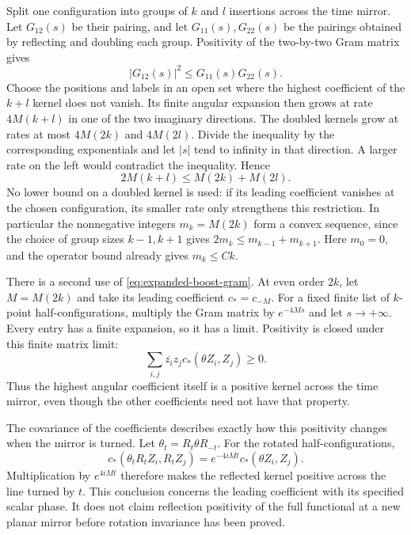 \documentclass[11pt,letterpaper,reqno]{amsart}
\theoremstyle{definition}
\theoremstyle{remark}
\begin{document}
Split one configuration into groups of $k$ and $l$ insertions across
the time mirror. Let $G_{12}(s)$ be their pairing, and let
$G_{11}(s),G_{22}(s)$ be the pairings obtained by reflecting and
doubling each group. Positivity of the two-by-two Gram matrix gives
\[
 |G_{12}(s)|^2\le G_{11}(s)G_{22}(s).
\]
Choose the positions and labels in an open set where the highest
coefficient of the $k+l$ kernel does not vanish. Its finite angular
expansion then grows at rate $4M(k+l)$ in one of the two imaginary
directions. The doubled kernels grow at rates at most $4M(2k)$ and
$4M(2l)$. Divide the inequality by the corresponding exponentials
and let $|s|$ tend to infinity in that direction. A larger rate on the
left would contradict the inequality. Hence
\begin{equation}\label{eq:degree-convexity}
 2M(k+l)\le M(2k)+M(2l).
\end{equation}
No lower bound on a doubled kernel is used: if its leading
coefficient vanishes at the chosen configuration, its smaller rate
only strengthens this restriction. In particular the nonnegative
integers $m_k=M(2k)$ form a convex sequence, since the choice of group
sizes $k-1,k+1$ gives $2m_k\le m_{k-1}+m_{k+1}$.
Here $m_0=0$, and the operator bound already gives $m_k\le Ck$.

There is a second use of \eqref{eq:expanded-boost-gram}. At even
order $2k$, let $M=M(2k)$ and take its leading coefficient
$c_*=c_{-M}$. For a fixed finite list of $k$-point
half-configurations, multiply the Gram matrix by $e^{-4Ms}$ and let
$s\to+\infty$. Every entry has a finite expansion, so it has a
limit. Positivity is closed under this finite matrix limit:
\begin{equation}\label{eq:expanded-leading-positive}
 \sum_{i,j}\overline{z_i}z_j
      c_*(\theta Z_i,Z_j)\ge0.
\end{equation}
Thus the highest angular coefficient itself is a positive kernel
across the time mirror, even though the other coefficients need not
have that property.

The covariance of the coefficients describes exactly how this
positivity changes when the mirror is turned. Let
$\theta_t=R_t\theta R_{-t}$. For the rotated half-configurations,
\[
 c_*(\theta_tR_tZ_i,R_tZ_j)
      =e^{-4iMt}c_*(\theta Z_i,Z_j).
\]
Multiplication by $e^{4iMt}$ therefore makes the reflected kernel
positive across the line turned by $t$. This conclusion concerns the
leading coefficient with its specified scalar phase. It does not
claim reflection positivity of the full functional at a new planar
mirror before rotation invariance has been proved.
\end{document}
